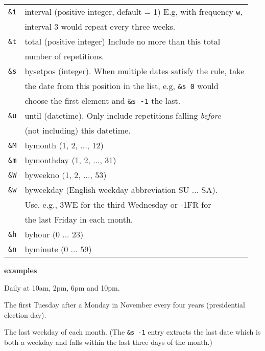 \documentclass[9pt,landscape]{article}
\begin{document}
\begin{multicols}{3}
\begin{tabular}{@{}ll@{}}
\texttt{\&i} & interval (positive integer, default = 1) E.g, with frequency \verb!w!, \\
             & interval 3 would repeat every three weeks. \\
\texttt{\&t} & total (positive integer) Include no more than this total \\
             & number of repetitions. \\
\texttt{\&s} & bysetpos (integer). When multiple dates satisfy the rule, take \\
             & the date from this position in the list, e.g, \verb!&s 0! would\\
             & choose the first element and \verb!&s -1! the last. \\
\texttt{\&u} & until (datetime). Only include repetitions falling \emph{before} \\
             & (not including) this datetime. \\
\texttt{\&M} & bymonth (1, 2, ..., 12) \\
\texttt{\&m} & bymonthday (1, 2, ..., 31) \\
\texttt{\&W} & byweekno (1, 2, ..., 53) \\
\texttt{\&w} & byweekday (English weekday abbreviation SU ... SA). \\
             & Use, e.g., 3WE for the third Wednesday or -1FR for \\
             & the last Friday in each month. \\
\texttt{\&h} & byhour (0 ... 23) \\
\texttt{\&n} & byminute (0 ... 59) \\
\end{tabular}

\vskip 4pt
\textbf{examples}
\vskip 3pt

\begin{compactdesc}
  \item[\texttt{@r d \&h 10, 14 18, 22}:]
    Daily at 10am, 2pm, 6pm and 10pm.
  \item[\texttt{@r y \&i 4 \&M 11 \&m range(2,9) \&w TU}:]
    The first Tuesday after a Monday in November every four years (presidential election day).
  \item[\texttt{@r m \&w MO, TU, WE, TH, FR \&m -1, -2, -3 \&s -1}:]
    The last weekday of each month. (The \verb!&s -1! entry extracts the last date which is both a weekday and falls within the last three days of the month.)
\end{compactdesc}


\end{multicols}
\end{document}
